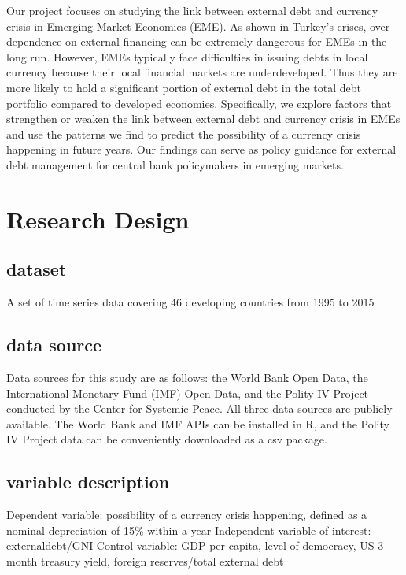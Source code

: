 \documentclass[12pt,]{article}
\begin{document}
Our project focuses on studying the link between external debt and
currency crisis in Emerging Market Economies (EME). As shown in Turkey's
crises, over-dependence on external financing can be extremely dangerous
for EMEs in the long run. However, EMEs typically face difficulties in
issuing debts in local currency because their local financial markets
are underdeveloped. Thus they are more likely to hold a significant
portion of external debt in the total debt portfolio compared to
developed economies. Specifically, we explore factors that strengthen or
weaken the link between external debt and currency crisis in EMEs and
use the patterns we find to predict the possibility of a currency crisis
happening in future years. Our findings can serve as policy guidance for
external debt management for central bank policymakers in emerging
markets.

\section{Research Design}\label{research-design}

\subsection{dataset}\label{dataset}

A set of time series data covering 46 developing countries from 1995 to
2015

\subsection{data source}\label{data-source}

Data sources for this study are as follows: the World Bank Open Data,
the International Monetary Fund (IMF) Open Data, and the Polity IV
Project conducted by the Center for Systemic Peace. All three data
sources are publicly available. The World Bank and IMF APIs can be
installed in R, and the Polity IV Project data can be conveniently
downloaded as a csv package.

\subsection{variable description}\label{variable-description}

Dependent variable: possibility of a currency crisis happening, defined
as a nominal depreciation of 15\% within a year Independent variable of
interest: externaldebt/GNI Control variable: GDP per capita, level of
democracy, US 3-month treasury yield, foreign reserves/total external
debt
\end{document}
